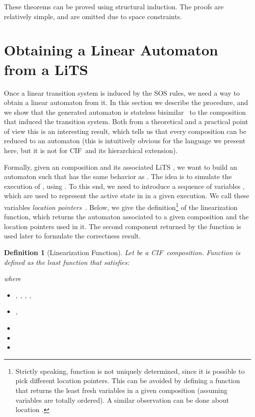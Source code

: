 \documentclass[submission,copyright,creativecommons,sharealike]{eptcs}
\newcommand{\CIF}{{CIF}}
\newtheorem{definition}{Definition}
\begin{document}
These theorems can be proved using structural induction.
  The proofs are relatively simple, and are omitted due to space
  constraints.




\section{Obtaining a Linear Automaton from a LiTS}
\label{sec:obta-line-autom}

Once a linear transition system is induced by the SOS rules, we need a
way to obtain a linear automaton from it. In this section we describe
the procedure, and we show that the generated automaton is stateless
bisimilar~\cite{MousaviRenGro:CongrSOSdataArtInfComp05} to the composition that induced the transition system. Both
from a theoretical and a practical point of view this is an
interesting result, which tells us that every composition can be
reduced to an automaton (this is intuitively obvious for the language
we present here, but it is not for \CIF\ and its hierarchical
extension).


Formally, given an composition  and its associated LiTS , we want to
build an automaton  such that  has the same behavior as
.
The idea is to simulate the execution of , using .
To this end, we need to introduce a sequence of variables ,
which are used to represent the active state in  in a given
execution. We call these variables \emph{location
  pointers}~\cite{Khadim3:LinHChiPCTech07}.
Below, we give the definition\footnote{Strictly speaking, function
   is not uniquely determined, since it is possible to pick
  different location pointers. This can be avoided by defining a function
  that returns the least  fresh variables in a given composition
  (assuming variables are totally ordered). A similar observation can
  be done about location .} of the linearization
function, which returns the automaton associated to a given
composition and the location pointers used in it. The second component
returned by the function is used later to formulate the correctness result.


\begin{definition}[Linearization Function]
  Let  be a \CIF\ composition. Function  is defined as the
  least function that satisfies:
  
  where
  \begin{itemize}
  \item , , , , 
  \item , 
  \item 
  \item 
  \item 
  \end{itemize}
\end{definition}
\end{document}
